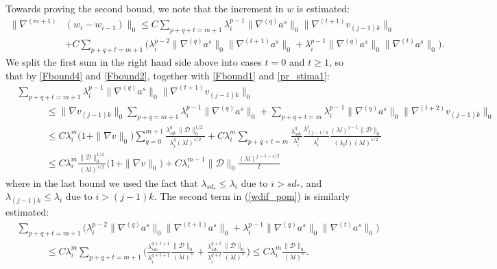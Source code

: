 \documentclass[reqno,twoside,11pt]{amsart}
\numberwithin{equation}{section}
\theoremstyle{plain}
\theoremstyle{definition}
\begin{document}
\smallskip

Towards proving the second bound, we note that the increment in $w$ is estimated:
\begin{equation}\label{wdif_pom}
\begin{split}
\|\nabla^{(m+1)}&(w_i-w_{i-1})\|_0  \leq  C
\sum_{p+q+t=m+1}\lambda_i^{p-1}\|\nabla^{(q)}a^s\|_0 \|\nabla^{(t+1)}v_{(j-1)k}\|_0
\\ & + C \sum_{p+q+t=m+1}\Big(\lambda_i^{p-2}\|\nabla^{(q)}a^s\|_0 \|\nabla^{(t+1)}a^s\|_0 +
\lambda_i^{p-1}\|\nabla^{(q)}a^s\|_0 \|\nabla^{(t)}a^s\|_0\Big). 
\end{split}
\end{equation}
We split the first sum in the right hand side above into cases $t=0$
and $t\geq 1$, so that by \ref{Fbound4} and \ref{Fbound2}, together
with \ref{Fbound1} and \ref{pr_stima1}:
\begin{equation*}
\begin{split}
& \sum_{p+q+t=m+1}\lambda_i^{p-1}\|\nabla^{(q)}a^s\|_0 \|\nabla^{(t+1)}v_{(j-1)k}\|_0
\\ & \qquad \quad\leq \|\nabla v_{(j-1)k}\|_0\sum_{p+q=m+1}\lambda_i^{p-1}\|\nabla^{(q)}a^s\|_0 
+ \sum_{p+q+t=m}\lambda_i^{p-1}\|\nabla^{(q)}a^s\|_0 \|\nabla^{(t+2)}v_{(j-1)k}\|_0
\\ &\qquad \quad \leq C\lambda_i^m \big(1+\|\nabla v\|_0\big)\sum_{q=0}^{m+1}
\frac{\lambda_{sd_*}^q \|\mathcal{D}\|_0^{1/2}}{\lambda_i^q (\lambda l)^{s/2}}
+ C\lambda_i^m \sum_{p+q+t=m}
\frac{\lambda_{sd_*}^q} {\lambda_i^q} \frac{\lambda_{(j-1)k}^t}{\lambda_i^t}\frac{
(\lambda l)^{j-1}\|\mathcal{D}\|_0}{(\lambda_i l)(\lambda l)^{s/2}} \\ &
\qquad\quad \leq C\lambda_i^{m} \frac{\|\mathcal{D}\|_0^{1/2}}{(\lambda l)^{s/2}}
\big(1+\|\nabla v\|_0\big) + C\lambda_i^{m-1} \|\mathcal{D}\|_0
\frac{(\lambda l)^{j-1-s/2}}{l}
\end{split}
\end{equation*}
where in the last bound we used the fact that $\lambda_{sd_*} \leq
\lambda_i $ due to $i>sd_*$, and $\lambda_{(j-1)k} \leq \lambda_i $ due to $i>(j-1)k$.
The second term in (\ref{wdif_pom}) is similarly estimated:
\begin{equation*}
\begin{split}
& \sum_{p+q+t=m+1}\Big(\lambda_i^{p-2}\|\nabla^{(q)}a^s\|_0 \|\nabla^{(t+1)}a^s\|_0 +
\lambda_i^{p-1}\|\nabla^{(q)}a^s\|_0 \|\nabla^{(t)}a^s\|_0\Big)
\\ &\qquad \quad \leq C\lambda_i^m \sum_{p+q+t=m+1}
\Big(\frac{\lambda_{sd_*}^{q+t+1}} {\lambda_i^{q+t+1}} \frac{\|\mathcal{D}\|_0}{(\lambda l)^{s}} 
+ \frac{\lambda_{sd_*}^{q+t}} {\lambda_i^{q+t}} \frac{\|\mathcal{D}\|_0}{(\lambda l)^{s}} \Big)\leq
C\lambda_i^m \frac{\|\mathcal{D}\|_0}{(\lambda l)^s}.
\end{split}
\end{equation*}
\end{document}
